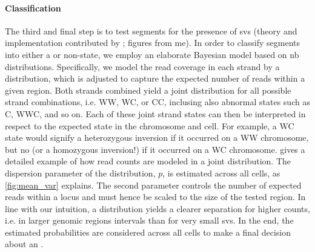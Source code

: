 
\paragraph{Classification} The third and final step is to test segments for the
presence of \acp{sv} (theory and implementation contributed by \maryam; figures
from me). In order to classify segments into either a \sv or non-\sv state, we
employ an elaborate Bayesian model based on \acl{nb} distributions.
Specifically, we model the read coverage in each strand by a \nb distribution,
which is adjusted to capture the expected number of reads within a given region.
Both strands combined yield a joint distribution for all possible strand
combinations, i.e. WW, WC, or CC, inclusing also abnormal states such as C, WWC,
and so on. Each of these joint strand states can then be interpreted in respect
to the expected state in the chromosome and cell. For example, a WC state would
signify a heterozygous inversion if it occurred on a WW chromosome, but no \sv
(or a homozygous inversion!) if it occurred on a WC chromosome.
 gives a detailed example of how read counts are modeled
in a joint \nb distribution. The dispersion parameter of the \nb distribution,
$p$, is estimated across all cells, as \cref{fig:mean_var} explains. The second
\nb parameter controls the number of expected reads within a locus and must
hence be scaled to the size of the tested region. In line with our intuition,
a \nb distribution yields a clearer separation for higher counts, i.e. in larger
genomic regions intervals than for very small \acp{sv}. In the end, the
estimated \nb probabilities are considered across all cells to make a final
decision about an \sv.


